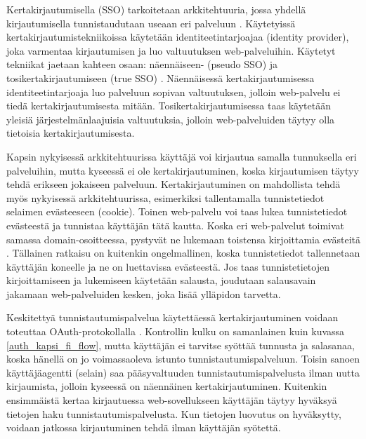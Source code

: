 Kertakirjautumisella (SSO) tarkoitetaan arkkitehtuuria, jossa yhdellä kirjautumisella tunnistaudutaan useaan eri palveluun \cite{sso}. Käytetyissä kertakirjautumistekniikoissa käytetään identiteetintarjoajaa (identity provider), joka varmentaa kirjautumisen ja luo valtuutuksen web-palveluihin. Käytetyt tekniikat jaetaan kahteen osaan: näennäiseen- (pseudo SSO) ja tosikertakirjautumiseen (true SSO) \cite{sso}. Näennäisessä kertakirjautumisessa identiteetintarjoaja luo palveluun sopivan valtuutuksen, jolloin web-palvelu ei tiedä kertakirjautumisesta mitään. Tosikertakirjautumisessa taas käytetään yleisiä järjestelmänlaajuisia valtuutuksia, jolloin web-palveluiden täytyy olla tietoisia kertakirjautumisesta.

Kapsin nykyisessä arkkitehtuurissa käyttäjä voi kirjautua samalla tunnuksella eri palveluihin, mutta kyseessä ei ole kertakirjautuminen, koska kirjautumisen täytyy tehdä erikseen jokaiseen palveluun. Kertakirjautuminen on mahdollista tehdä myös nykyisessä arkkitehtuurissa, esimerkiksi tallentamalla tunnistetiedot selaimen evästeeseen (cookie). Toinen web-palvelu voi taas lukea tunnistetiedot evästeestä ja tunnistaa käyttäjän tätä kautta. Koska eri web-palvelut toimivat samassa domain-osoitteessa, pystyvät ne lukemaan toistensa kirjoittamia evästeitä \cite{rfc6265}. Tällainen ratkaisu on kuitenkin ongelmallinen, koska tunnistetiedot tallennetaan käyttäjän koneelle ja ne on luettavissa evästeestä. Jos taas tunnistetietojen kirjoittamiseen ja lukemiseen käytetään salausta, joudutaan salausavain jakamaan web-palveluiden kesken, joka lisää ylläpidon tarvetta.

Keskitettyä tunnistautumispalvelua käytettäessä kertakirjautuminen voidaan toteuttaa OAuth-protokollalla \cite{distributed_web_security}. Kontrollin kulku on samanlainen kuin kuvassa \ref{auth_kapsi_fi_flow}, mutta käyttäjän ei tarvitse syöttää tunnusta ja salasanaa, koska hänellä on jo voimassaoleva istunto tunnistautumispalveluun. Toisin sanoen käyttäjäagentti (selain) saa pääsyvaltuuden tunnistautumispalvelusta ilman uutta kirjaumista, jolloin kyseessä on näennäinen kertakirjautuminen. Kuitenkin ensimmäistä kertaa kirjautuessa web-sovellukseen käyttäjän täytyy hyväksyä tietojen haku tunnistautumispalvelusta. Kun tietojen luovutus on hyväksytty, voidaan jatkossa kirjautuminen tehdä ilman käyttäjän syötettä.